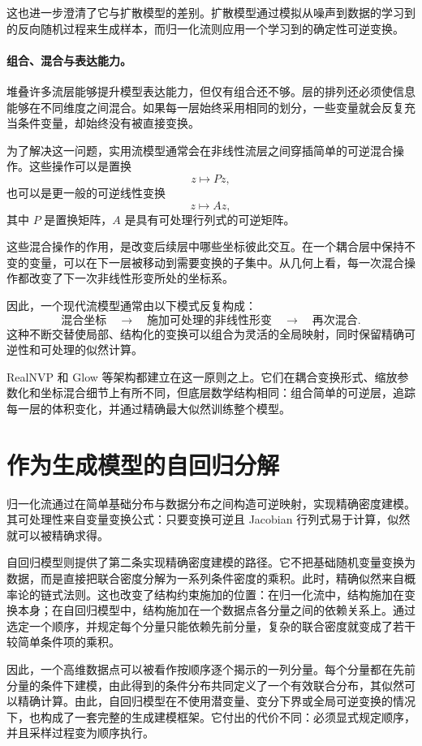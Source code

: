 这也进一步澄清了它与扩散模型的差别。扩散模型通过模拟从噪声到数据的学习到的反向随机过程来生成样本，而归一化流则应用一个学习到的确定性可逆变换。

\paragraph{组合、混合与表达能力。}

堆叠许多流层能够提升模型表达能力，但仅有组合还不够。层的排列还必须使信息能够在不同维度之间混合。如果每一层始终采用相同的划分，一些变量就会反复充当条件变量，却始终没有被直接变换。

为了解决这一问题，实用流模型通常会在非线性流层之间穿插简单的可逆混合操作。这些操作可以是置换
\[
z\mapsto Pz,
\]
也可以是更一般的可逆线性变换
\[
z\mapsto Az,
\]
其中 $P$ 是置换矩阵，$A$ 是具有可处理行列式的可逆矩阵。

这些混合操作的作用，是改变后续层中哪些坐标彼此交互。在一个耦合层中保持不变的变量，可以在下一层被移动到需要变换的子集中。从几何上看，每一次混合操作都改变了下一次非线性形变所处的坐标系。

因此，一个现代流模型通常由以下模式反复构成：
\[
\text{混合坐标}
\quad\longrightarrow\quad
\text{施加可处理的非线性形变}
\quad\longrightarrow\quad
\text{再次混合}.
\]
这种不断交替使局部、结构化的变换可以组合为灵活的全局映射，同时保留精确可逆性和可处理的似然计算。

RealNVP 和 Glow 等架构都建立在这一原则之上。它们在耦合变换形式、缩放参数化和坐标混合细节上有所不同，但底层数学结构相同：组合简单的可逆层，追踪每一层的体积变化，并通过精确最大似然训练整个模型。

\section{作为生成模型的自回归分解}

归一化流通过在简单基础分布与数据分布之间构造可逆映射，实现精确密度建模。其可处理性来自变量变换公式：只要变换可逆且 Jacobian 行列式易于计算，似然就可以被精确求得。

自回归模型则提供了第二条实现精确密度建模的路径。它不把基础随机变量变换为数据，而是直接把联合密度分解为一系列条件密度的乘积。此时，精确似然来自概率论的链式法则。这也改变了结构约束施加的位置：在归一化流中，结构施加在变换本身；在自回归模型中，结构施加在一个数据点各分量之间的依赖关系上。通过选定一个顺序，并规定每个分量只能依赖先前分量，复杂的联合密度就变成了若干较简单条件项的乘积。

因此，一个高维数据点可以被看作按顺序逐个揭示的一列分量。每个分量都在先前分量的条件下建模，由此得到的条件分布共同定义了一个有效联合分布，其似然可以精确计算。由此，自回归模型在不使用潜变量、变分下界或全局可逆变换的情况下，也构成了一套完整的生成建模框架。它付出的代价不同：必须显式规定顺序，并且采样过程变为顺序执行。

